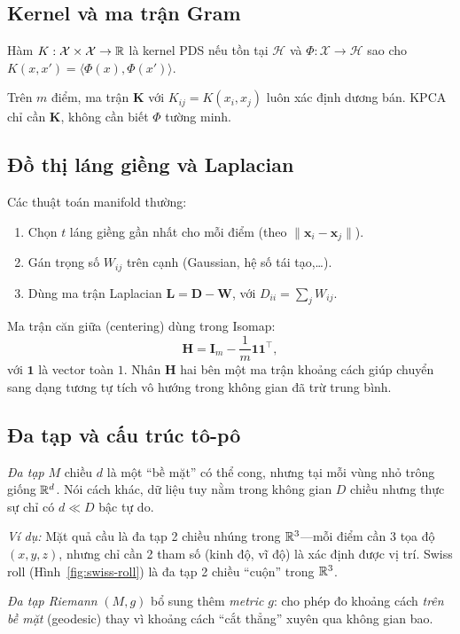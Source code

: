 \subsection{Kernel và ma trận Gram}

\begin{definition}
Hàm $K : \mathcal{X} \times \mathcal{X} \to \mathbb{R}$ là kernel PDS nếu tồn tại $\mathcal{H}$ và $\Phi : \mathcal{X} \to \mathcal{H}$ sao cho $K(x,x') = \langle \Phi(x), \Phi(x') \rangle$.
\end{definition}

Trên $m$ điểm, ma trận $\mathbf{K}$ với $K_{ij} = K(x_i,x_j)$ luôn xác định dương bán. KPCA chỉ cần $\mathbf{K}$, không cần biết $\Phi$ tường minh.

\subsection{Đồ thị láng giềng và Laplacian}

Các thuật toán manifold thường:
\begin{enumerate}
  \item Chọn $t$ láng giềng gần nhất cho mỗi điểm (theo $\|\mathbf{x}_i - \mathbf{x}_j\|$).
  \item Gán trọng số $W_{ij}$ trên cạnh (Gaussian, hệ số tái tạo,\ldots).
  \item Dùng ma trận Laplacian $\mathbf{L} = \mathbf{D} - \mathbf{W}$, với $D_{ii} = \sum_j W_{ij}$.
\end{enumerate}

Ma trận căn giữa (centering) dùng trong Isomap:
\[
\mathbf{H} = \mathbf{I}_m - \frac{1}{m}\mathbf{1}\mathbf{1}^\top,
\]
với $\mathbf{1}$ là vector toàn $1$. Nhân $\mathbf{H}$ hai bên một ma trận khoảng cách giúp chuyển sang dạng tương tự tích vô hướng trong không gian đã trừ trung bình.

\subsection{Đa tạp và cấu trúc tô-pô}
\label{sec:manifold-topo}

\begin{definition}
\label{def:manifold}
\emph{Đa tạp} $M$ chiều $d$ là một ``bề mặt'' có thể cong, nhưng tại mỗi vùng nhỏ trông giống $\mathbb{R}^d$. Nói cách khác, dữ liệu tuy nằm trong không gian $D$ chiều nhưng thực sự chỉ có $d \ll D$ bậc tự do.

\emph{Ví dụ:} Mặt quả cầu là đa tạp 2 chiều nhúng trong $\mathbb{R}^3$---mỗi điểm cần 3 tọa độ $(x,y,z)$, nhưng chỉ cần 2 tham số (kinh độ, vĩ độ) là xác định được vị trí. Swiss roll (Hình~\ref{fig:swiss-roll}) là đa tạp 2 chiều ``cuộn'' trong $\mathbb{R}^3$.

\emph{Đa tạp Riemann} $(M,g)$ bổ sung thêm \emph{metric} $g$: cho phép đo khoảng cách \emph{trên bề mặt} (geodesic) thay vì khoảng cách ``cắt thẳng'' xuyên qua không gian bao.
\end{definition}

